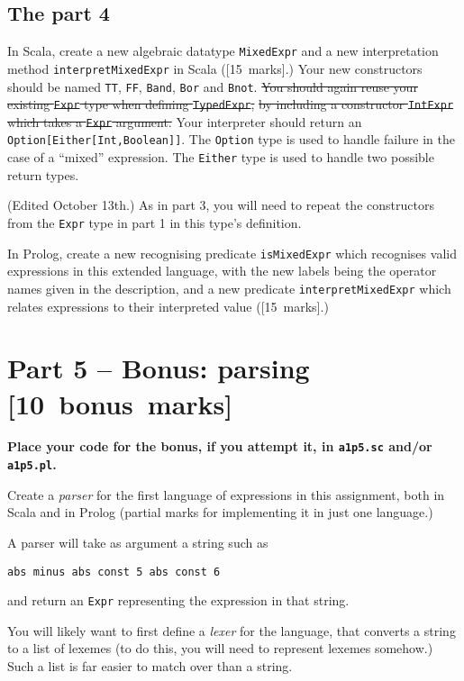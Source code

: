 \documentclass[11pt]{article}
\begin{document}
\subsection*{The part 4}
\label{sec:org91f4fa2}
In Scala, create a new algebraic datatype \texttt{MixedExpr} and a new
interpretation method \texttt{interpretMixedExpr} in Scala ([15 marks].)
Your new constructors should be named \texttt{TT}, \texttt{FF}, \texttt{Band}, \texttt{Bor} and \texttt{Bnot}.
\sout{You should again reuse your existing \texttt{Expr} type when defining \texttt{TypedExpr},}
\sout{by including a constructor \texttt{IntExpr} which takes a \texttt{Expr} argument.}
Your interpreter should return an \texttt{Option[Either[Int,Boolean]]}.
The \texttt{Option} type is used to handle failure in the case
of a “mixed” expression.
The \texttt{Either} type is used to handle two possible return types.

(Edited October 13th.)
As in part 3, you will need to repeat the constructors from the
\texttt{Expr} type in part 1 in this type's definition.

In Prolog, create a new recognising predicate \texttt{isMixedExpr} which
recognises valid expressions in this extended language,
with the new labels being the operator names given in the description,
and a new predicate \texttt{interpretMixedExpr} which relates
expressions to their interpreted value ([15 marks].)

\section*{Part 5 – Bonus: parsing                [10 bonus marks]}
\label{sec:org2789284}
\begin{center}
\textbf{Place your code for the bonus, if you attempt it, in \texttt{a1p5.sc} and/or \texttt{a1p5.pl}.}
\end{center}

Create a \emph{parser} for the first language of expressions
in this assignment, both in Scala and in Prolog
(partial marks for implementing it in just one language.)

A parser will take as argument a string such as
\begin{verbatim}
abs minus abs const 5 abs const 6
\end{verbatim}
and return an \texttt{Expr} representing the expression in that string.

You will likely want to first define a \emph{lexer} for the language,
that converts a string to a list of lexemes
(to do this, you will need to represent lexemes somehow.)
Such a list is far easier to match over than a string.
\end{document}
